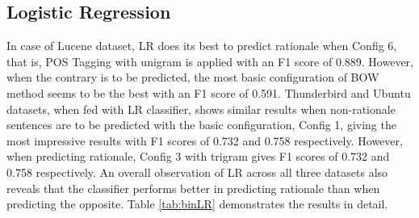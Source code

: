 \documentclass[a4paper,12pt,twoside]{report}
\begin{document}
\subsection{Logistic Regression}
In case of Lucene dataset, \acs{LR} does its best to predict rationale when Config 6, that is, \acs{POS} Tagging with unigram is applied with an F1 score of 0.889. However, when the contrary is to be predicted, the most basic configuration of \acs{BOW} method seems to be the best with an F1 score of 0.591. Thunderbird and Ubuntu datasets, when fed with \acs{LR} classifier, shows similar results when non-rationale sentences are to be predicted with the basic configuration, Config 1, giving the most impressive results with F1 scores of 0.732 and 0.758 respectively. However, when predicting rationale, Config 3 with trigram gives F1 scores of 0.732 and 0.758 respectively. An overall observation of \acs{LR} across all three datasets also reveals that the classifier performs better in predicting rationale than when predicting the opposite. Table \ref{tab:binLR} demonstrates the results in detail. 
\end{document}
